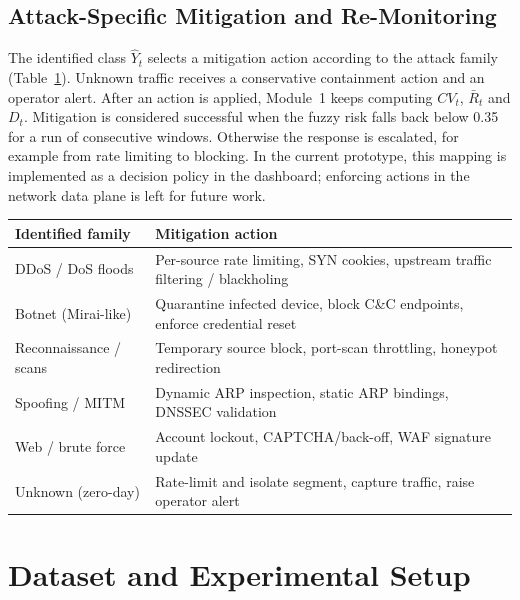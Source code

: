 \documentclass[]{interact}
\theoremstyle{plain}
\theoremstyle{definition}
\begin{document}
\subsection{Attack-Specific Mitigation and Re-Monitoring}
The identified class $\hat{Y}_t$ selects a mitigation action according to the attack family (Table~\ref{tab:mitig}). Unknown traffic receives a conservative containment action and an operator alert. After an action is applied, Module~1 keeps computing $CV_t$, $\bar{R}_t$ and $D_t$. Mitigation is considered successful when the fuzzy risk falls back below 0.35 for a run of consecutive windows. Otherwise the response is escalated, for example from rate limiting to blocking. In the current prototype, this mapping is implemented as a decision policy in the dashboard; enforcing actions in the network data plane is left for future work.

\begin{table}[t]
{\begin{tabular}{lp{}}
\toprule
Identified family & Mitigation action \\
\midrule
DDoS / DoS floods        & Per-source rate limiting, SYN cookies, upstream traffic filtering / blackholing \\
Botnet (Mirai-like)      & Quarantine infected device, block C\&C endpoints, enforce credential reset \\
Reconnaissance / scans   & Temporary source block, port-scan throttling, honeypot redirection \\
Spoofing / MITM          & Dynamic ARP inspection, static ARP bindings, DNSSEC validation \\
Web / brute force        & Account lockout, CAPTCHA/back-off, WAF signature update \\
Unknown (zero-day)       & Rate-limit and isolate segment, capture traffic, raise operator alert \\
\bottomrule
\end{tabular}}
\label{tab:mitig}
\end{table}

\section{Dataset and Experimental Setup}\label{sec:setup}
\end{document}
